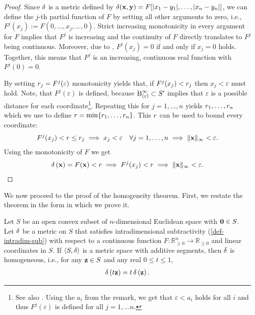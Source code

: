 \begin{proof}
	Since $\metric$ is a metric defined by $\metric(\ve{x},\ve{y}) = F[|x_1 - y_1|, \dots, |x_n - y_n|]$, we can define the $j$-th partial function of $F$ by setting all other arguments to zero, i.e., $F^j(x_j) := F(0, \dots, x_j, \dots, 0)$.
	Strict increasing monotonicity in every argument for $F$ implies that $F^j$ is increasing and the continuity of $F$ directly translates to $F^j$ being continuous.
	Moreover, due to , $F^j(x_j) = 0$ if and only if $x_j = 0$ holds.
	Together, this means that $F^j$ is an increasing, continuous real function with $F^j(0) = 0$.

	By setting $\dis_j = F^j(\varepsilon)$ monotonicity yields that, if $F^j(x_j) < \dis_j$ then $x_j < \varepsilon$ must hold. Note, that $F^j(\varepsilon)$ is defined, because  $\ball[\infty]{\varepsilon} \subset S'$ implies that $\varepsilon$ is a possible distance for each coordinate\footnote{See also . Using the $a_i$ from the remark, we get that $\varepsilon < a_i$ holds for all $i$ and thus $F^j(\varepsilon)$ is defined for all $j = 1, \dots n$.}.
	Repeating this for $j = 1, \dots, n$ yields $\dis_1, \dots, \dis_n$ which we use to define $\dis = \min \{\dis_1, \dots, \dis_n\}$.
  This $\dis$ can be used to bound every coordinate:
	$$ F^j(x_j) < \dis \leq \dis_j \implies x_j < \varepsilon \quad \forall j = 1, \dots, n \implies \|\ve{x}\|_{\infty} < \varepsilon.$$
	Using the monotonicity of $F$ we get
	$$\metro{\ve{x}} = F(\ve{x}) < \dis \implies F^j(x_j) < \dis \implies \|\ve{x}\|_\infty < \varepsilon.$$
\end{proof}

We now proceed to the proof of the homogeneity theorem. First, we restate the theorem in the form in which we prove it.

\begin{lem*}
	Let $S$ be an open convex subset of $n$-dimensional Euclidean space with $\ve{0} \in S$. Let $\metric$ be a metric on $S$ that satisfies intradimensional subtractivity (\cref{def-intradim-sub}) with respect to a continuous function $F: \mathbb{R}_{\geq 0}^n \rightarrow \mathbb{R}_{\geq 0}$ and linear coordinates in $S$. If $\langle S, \metric \rangle$ is a metric space with additive segments, then $\metric$ is homogeneous, i.e., for any $\ve{z} \in S$ and any real $0 \leq t \leq 1$,
	\begin{align*}
		\metro{t\ve{z}} = t\metro{\ve{z}}.
	\end{align*}
\end{lem*}

